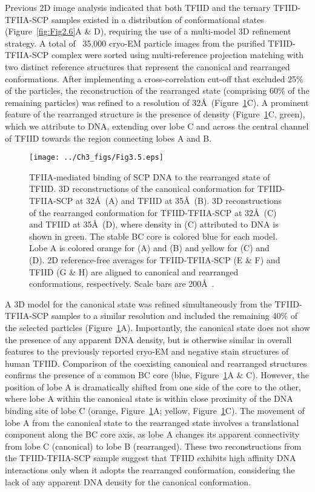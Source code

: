 Previous 2D image analysis indicated that both TFIID and the ternary TFIID-TFIIA-SCP samples existed in a distribution of conformational states (Figure~\ref{fig:Fig2.6}A \& D), requiring the use of a multi-model 3D refinement strategy. A total of ~35,000 cryo-EM particle images from the purified TFIID-TFIIA-SCP complex were sorted using multi-reference projection matching with two distinct reference structures that represent the canonical and rearranged conformations. After implementing a cross-correlation cut-off that excluded 25\% of the particles, the reconstruction of the rearranged state (comprising 60\% of the remaining particles) was refined to a resolution of 32\AA\ (Figure~\ref{fig:Fig3.5}C). A prominent feature of the rearranged structure is the presence of density (Figure~\ref{fig:Fig3.5}C, green), which we attribute to DNA, extending over lobe C and across the central channel of TFIID towards the region connecting lobes A and B. \\
\begin{figure}
\centering
\texttt{[image: ../Ch3\_figs/Fig3.5.eps]}
\caption[TFIIA-mediated binding of SCP DNA to the rearranged state of TFIID]{TFIIA-mediated binding of SCP DNA to the rearranged state of TFIID. 3D reconstructions of the canonical conformation for TFIID-TFIIA-SCP at 32\AA\ (A) and TFIID at 35\AA\ (B).  3D reconstructions of the rearranged conformation for TFIID-TFIIA-SCP at 32\AA\ (C) and TFIID at 35\AA\ (D), where density in (C) attributed to DNA is shown in green. The stable BC core is colored blue for each model. Lobe A is colored orange for (A) and (B) and yellow for (C) and (D). 2D reference-free averages for TFIID-TFIIA-SCP (E \& F) and TFIID (G \& H) are aligned to canonical and rearranged conformations, respectively. Scale bars are 200\AA\ .}
\label{fig:Fig3.5}
\end{figure}
\indent A 3D model for the canonical state was refined simultaneously from the TFIID-TFIIA-SCP samples to a similar resolution and included the remaining 40\% of the selected particles (Figure~\ref{fig:Fig3.5}A). Importantly, the canonical state does not show the presence of any apparent DNA density, but is otherwise similar in overall features to the previously reported cryo-EM \cite{Grob_1281} and negative stain \cite{Liu_574} structures of human TFIID. Comparison of the coexisting canonical and rearranged structures confirms the presence of a common BC core (blue, Figure~\ref{fig:Fig3.5}A \& C). However, the position of lobe A is dramatically shifted from one side of the core to the other, where lobe A within the canonical state is within close proximity of the DNA binding site of lobe C (orange, Figure~\ref{fig:Fig3.5}A; yellow, Figure~\ref{fig:Fig3.5}C). The movement of lobe A from the canonical state to the rearranged state involves a translational component along the BC core axis, as lobe A changes its apparent connectivity from lobe C (canonical) to lobe B (rearranged). These two reconstructions from the TFIID-TFIIA-SCP sample suggest that TFIID exhibits high affinity DNA interactions only when it adopts the rearranged conformation, considering the lack of any apparent DNA density for the canonical conformation.\\
